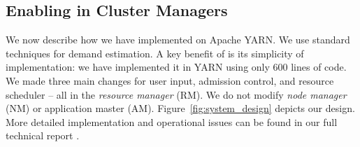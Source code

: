 %
%
%
%


\vspace{-0.1in}
\subsection{Enabling \name in Cluster Managers}

We now describe how we have implemented \name on Apache YARN. We use standard techniques for demand estimation.
A key benefit of {\name} is its simplicity of implementation: we have implemented it in YARN using only $600$ lines of code. We made three main changes for user input, admission control, and resource scheduler -- all in the \emph{resource manager} (RM). 
We do not modify \emph{node manager} (NM) or application master (AM). 
Figure~\ref{fig:system_design} depicts our design.
More detailed implementation and operational issues can be found in our full technical report \cite{tech_report}.

